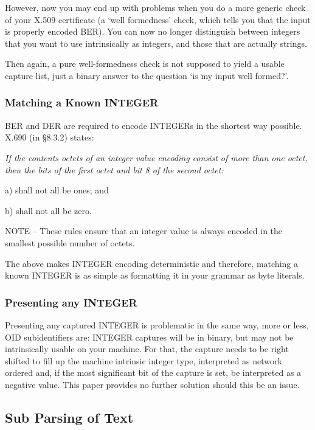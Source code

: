However, now you may end up with problems when you do a more generic check 
of your X.509 certificate (a ‘well formedness’ check, which tells you 
that the input is properly encoded BER). You can now no longer distinguish 
between integers that you want to use intrinsically as integers, and those 
that are actually strings.

Then again, a pure well-formedness check is not supposed to yield a usable 
capture list, just a binary answer to the question ‘is my input well 
formed?’.

\subsubsection{Matching a Known INTEGER}
\label{sec:work:ints:known}

BER and DER are required to encode INTEGERs in the shortest way possible. 
X.690 \cite{bib:x690} (in §8.3.2) states:

{\itshape
If the contents octets of an integer value encoding consist of more than 
one octet, then the bits of the first octet and bit 8 of the second octet:

a) shall not all be ones; and

b) shall not all be zero.

NOTE – These rules ensure that an integer value is always encoded in the 
smallest possible number of octets.
}

The above makes INTEGER encoding deterministic and therefore, matching a 
known INTEGER is as simple as formatting it in your grammar as byte 
literals.

\subsubsection{Presenting any INTEGER}
\label{sec:work:ints:presenting}

Presenting any captured INTEGER is problematic in the same way, more or 
less, OID subidentifiers are: INTEGER captures will be in binary, but may 
not be intrinsically usable on your machine. For that, the capture needs 
to be right shifted to fill up the machine intrinsic integer type, 
interpreted as network ordered and, if the most significant bit of the 
capture is set, be interpreted as a negative value. This paper provides no 
further solution should this be an issue.

\subsection{Sub Parsing of Text}

